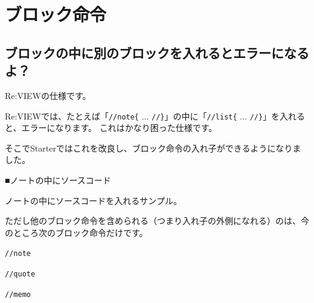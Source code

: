 \endstarterresult

\section{ブロック命令}
\label{sec:2-3}
\label{sec-faq-block}

\subsection*{ブロックの中に別のブロックを入れるとエラーになるよ？}
\label{sec:2-3-1}
\label{subsec-faq-block1}

Re:VIEWの仕様です。

Re:VIEWでは、たとえば「\texttt{//note\{} ... \texttt{//\}}」の中に「\texttt{//list\{} ... \texttt{//\}}」を入れると、エラーになります。
これはかなり困った仕様です。

そこでStarterではこれを改良し、ブロック命令の入れ子ができるようになりました。

\begin{starterprogram}\end{starterprogram}
\noindent
{}

\starterresult
\begin{starternote}{■ノートの中にソースコード}
\begin{starternoteinner}

ノートの中にソースコードを入れるサンプル。

\label{}
\end{starternoteinner}
\begin{starterprogram}\end{starterprogram}
\end{starternote}
\endstarterresult

ただし他のブロック命令を含められる（つまり入れ子の外側になれる）のは、今のところ次のブロック命令だけです。

\begin{starteritemize}
\item \texttt{//note}
\item \texttt{//quote}
\item \texttt{//memo}
\end{starteritemize}

